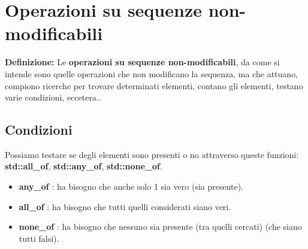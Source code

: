 


\newpage

\section{Operazioni su sequenze non-modificabili}

\textsf{\small \textbf{Definizione: } Le \textbf{operazioni su sequenze non-modificabili}, da come si intende sono quelle operazioni che non modificano la sequenza, ma che attuano, compiono ricerche per trovare determinati elementi, contano gli elementi, testano varie condizioni, eccetera..} \\

\subsection{Condizioni}

\textsf{\small Possiamo testare se degli elementi sono presenti o no attraverso queste funzioni: \textbf{std::all\_of}, \textbf{std::any\_of}, \textbf{std::none\_of}.} \\

\begin{itemize}
	\item \textsf{\small \textbf{any\_of} : ha bisogno che anche solo 1 sia vero (sia presente).}
	\item \textsf{\small \textbf{all\_of} : ha bisogno che tutti quelli considerati siano veri.}
	\item \textsf{\small \textbf{none\_of} : ha bisogno che nessuno sia presente (tra quelli cercati) (che siano tutti falsi).}
\end{itemize}

